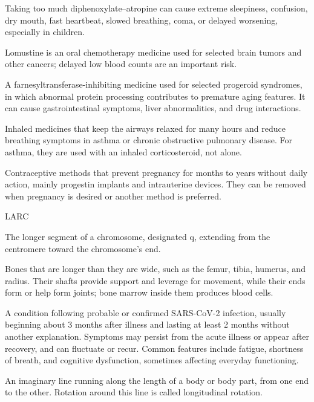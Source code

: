  Taking too much diphenoxylate–atropine can cause extreme sleepiness, confusion, dry mouth, fast heartbeat, slowed breathing, coma, or delayed worsening, especially in children.

 Lomustine is an oral chemotherapy medicine used for selected brain tumors and other cancers; delayed low blood counts are an important risk.

 A farnesyltransferase-inhibiting medicine used for selected progeroid syndromes, in which abnormal protein processing contributes to premature aging features. It can cause gastrointestinal symptoms, liver abnormalities, and drug interactions.

 Inhaled medicines that keep the airways relaxed for many hours and reduce breathing symptoms in asthma or chronic obstructive pulmonary disease. For asthma, they are used with an inhaled corticosteroid, not alone.

 Contraceptive methods that prevent pregnancy for months to years without daily action, mainly progestin implants and intrauterine devices. They can be removed when pregnancy is desired or another method is preferred.

\synonyms
LARC

 The longer segment of a chromosome, designated q, extending from the centromere toward the chromosome's end.

 Bones that are longer than they are wide, such as the femur, tibia, humerus, and radius. Their shafts provide support and leverage for movement, while their ends form or help form joints; bone marrow inside them produces blood cells.

 A condition following probable or confirmed SARS-CoV-2 infection, usually beginning about 3 months after illness and lasting at least 2 months without another explanation. Symptoms may persist from the acute illness or appear after recovery, and can fluctuate or recur. Common features include fatigue, shortness of breath, and cognitive dysfunction, sometimes affecting everyday functioning.

 An imaginary line running along the length of a body or body part, from one end to the other. Rotation around this line is called longitudinal rotation.

